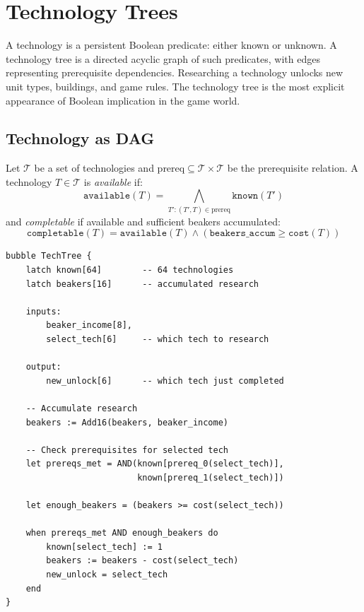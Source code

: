 \documentclass[11pt,a4paper,openany]{book}
\theoremstyle{plain}
\theoremstyle{definition}
\theoremstyle{remark}
\newenvironment{background}{%
  \begin{mdframed}[
    linecolor=sphereblue!40, backgroundcolor=sphereblue!5,
    linewidth=1pt, innertopmargin=8pt, innerbottommargin=8pt,
    innerleftmargin=10pt, innerrightmargin=10pt,
    skipabove=10pt, skipbelow=6pt
  ]%
  \setlength{\parindent}{0pt}%
  \noindent{\textcolor{sphereblue}{\textbf{Background}}}\par\smallskip\ignorespaces
}{\end{mdframed}}
\newenvironment{implementation}{%
  \begin{mdframed}[
    linecolor=sphereamber!80, backgroundcolor=sphereamber!5,
    linewidth=1pt, innertopmargin=8pt, innerbottommargin=8pt,
    innerleftmargin=10pt, innerrightmargin=10pt,
    skipabove=10pt, skipbelow=6pt
  ]%
  \setlength{\parindent}{0pt}%
  \noindent{\textcolor{sphereamber!80!black}{\textbf{Implementation}}}\par\smallskip\ignorespaces
}{\end{mdframed}}
\newenvironment{defbox}[1]{%
  \begin{tcolorbox}[
    title={\textbf{Definition:} #1},
    colback=defbg,
    colframe=sphereamber!80,
    fonttitle=\bfseries,
    coltitle=sphereamber!60!black,
    sharp corners,
    breakable,
    before upper={\normalfont\setlength{\parindent}{0pt}\tolerance=9999\hbadness=9999}
  ]
}{\end{tcolorbox}}
\newcommand{\Spbox}{\textsc{Spherepop}\xspace}
\newcommand{\Spbox}{\textbf{Spherepop}\xspace}
\newcommand{\AND}{\ensuremath{\wedge}}
\begin{document}
\chapter{Technology Trees}
\label{ch:tech}

\begin{background}
  A technology is a persistent Boolean predicate: either known or unknown.
  A technology tree is a directed acyclic graph of such predicates, with
  edges representing prerequisite dependencies. Researching a technology
  unlocks new unit types, buildings, and game rules. The technology tree
  is the most explicit appearance of Boolean implication in the game
  world.
\end{background}

\section{Technology as DAG}

\begin{defbox}{Technology DAG}
  Let $\mathcal{T}$ be a set of technologies and
  $\text{prereq} \subseteq \mathcal{T} \times \mathcal{T}$ be the
  prerequisite relation. A technology $T \in \mathcal{T}$ is
  \emph{available} if:
  \[
    \texttt{available}(T) = \bigwedge_{T' : (T', T) \in \text{prereq}}
    \texttt{known}(T')
  \]
  and \emph{completable} if available and sufficient beakers accumulated:
  \[
    \texttt{completable}(T) = \texttt{available}(T) \AND
    (\texttt{beakers\_accum} \geq \texttt{cost}(T))
  \]
\end{defbox}

\begin{implementation}
\begin{lstlisting}[caption={Technology unlock in \Spbox }]
bubble TechTree {
    latch known[64]        -- 64 technologies
    latch beakers[16]      -- accumulated research

    inputs:
        beaker_income[8],
        select_tech[6]     -- which tech to research

    output:
        new_unlock[6]      -- which tech just completed

    -- Accumulate research
    beakers := Add16(beakers, beaker_income)

    -- Check prerequisites for selected tech
    let prereqs_met = AND(known[prereq_0(select_tech)],
                          known[prereq_1(select_tech)])

    let enough_beakers = (beakers >= cost(select_tech))

    when prereqs_met AND enough_beakers do
        known[select_tech] := 1
        beakers := beakers - cost(select_tech)
        new_unlock = select_tech
    end
}
\end{lstlisting}
\end{implementation}
\end{document}
